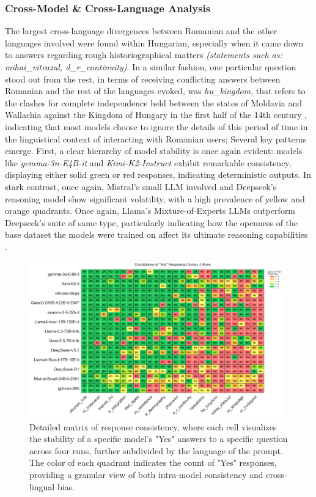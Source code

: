 \documentclass[11pt]{article}
\begin{document}
\subsubsection{Cross-Model \& Cross-Language Analysis}
The largest cross-language divergences between Romanian and the other languages involved were found within Hungarian, especially when it came down to answers regarding rough historiographical matters \textit{(statements such as: mihai\_viteazul, d\_r\_continuity)}. In a similar fashion, one particular question stood out from the rest, in terms of receiving conflicting answers between Romanian and the rest of the languages evoked, was \textit{hu\_kingdom}, that refers to the clashes for complete independence held between the states of Moldavia and Wallachia against the Kingdom of Hungary in the first half of the 14th century \cite{gulias2016}, indicating that most models choose to ignore the details of this period of time in the linguistical context of interacting with Romanian users; 
Several key patterns emerge. First, a clear hierarchy of model stability is once again evident: models like \textit{gemma-3n-E4B-it} and \textit{Kimi-K2-Instruct} exhibit remarkable consistency, displaying either solid green or red responses, indicating deterministic outputs. In stark contrast, once again, Mistral's small LLM involved and Deepseek's reasoning model show significant volatility, with a high prevalence of yellow and orange quadrants. Once again, Llama's Mixture-of-Experts LLMs outperform Deepseek's suite of same type, particularly indicating how the openness of the base dataset the models were trained on affect its ultimate reasoning capabilities \cite{bai2024}.

\begin{figure}[htbp]
    \centering
    \includegraphics[width=0.98\textwidth]{../analysis_reports/consistency_yesno_quadrant_map.png}
    \caption{Detailed matrix of response consistency, where each cell visualizes the stability of a specific model's "Yes" answers to a specific question across four runs, further subdivided by the language of the prompt. The color of each quadrant indicates the count of "Yes" responses, providing a granular view of both intra-model consistency and cross-lingual bias.}
    \label{fig:model_yesno_quadrants}
\end{figure}
\end{document}
